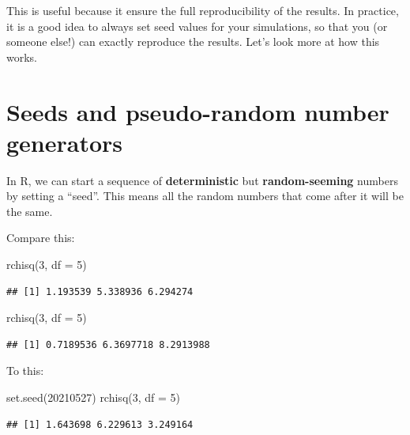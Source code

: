 \documentclass[
]{book}
\newenvironment{Shaded}{\begin{snugshade}}{\end{snugshade}}
\newcommand{\AttributeTok}[1]{\textcolor[rgb]{0.77,0.63,0.00}{#1}}
\newcommand{\DecValTok}[1]{\textcolor[rgb]{0.00,0.00,0.81}{#1}}
\newcommand{\FunctionTok}[1]{\textcolor[rgb]{0.00,0.00,0.00}{#1}}
\newcommand{\NormalTok}[1]{#1}
\begin{document}
This is useful because it ensure the full reproducibility of the results. In practice, it is a good idea to always set seed values for your simulations, so that you (or someone else!) can exactly reproduce the results.
Let's look more at how this works.

\hypertarget{seeds-and-pseudo-random-number-generators}{%
\section{Seeds and pseudo-random number generators}\label{seeds-and-pseudo-random-number-generators}}

In R, we can start a sequence of \textbf{deterministic} but \textbf{random-seeming} numbers by setting a ``seed''.
This means all the random numbers that come after it will be the same.

Compare this:

\begin{Shaded}
\begin{Highlighting}[]
\FunctionTok{rchisq}\NormalTok{(}\DecValTok{3}\NormalTok{, }\AttributeTok{df =} \DecValTok{5}\NormalTok{)}
\end{Highlighting}
\end{Shaded}

\begin{verbatim}
## [1] 1.193539 5.338936 6.294274
\end{verbatim}

\begin{Shaded}
\begin{Highlighting}[]
\FunctionTok{rchisq}\NormalTok{(}\DecValTok{3}\NormalTok{, }\AttributeTok{df =} \DecValTok{5}\NormalTok{)}
\end{Highlighting}
\end{Shaded}

\begin{verbatim}
## [1] 0.7189536 6.3697718 8.2913988
\end{verbatim}

To this:

\begin{Shaded}
\begin{Highlighting}[]
\FunctionTok{set.seed}\NormalTok{(}\DecValTok{20210527}\NormalTok{)}
\FunctionTok{rchisq}\NormalTok{(}\DecValTok{3}\NormalTok{, }\AttributeTok{df =} \DecValTok{5}\NormalTok{)}
\end{Highlighting}
\end{Shaded}

\begin{verbatim}
## [1] 1.643698 6.229613 3.249164
\end{verbatim}
\end{document}

